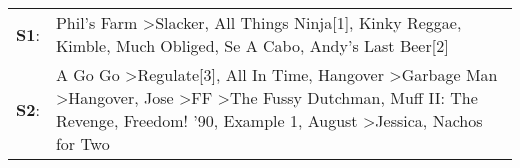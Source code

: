 \begin{supertabular}{p{0.03\textwidth}p{0.92\textwidth}}
 \textbf{S1}:  &                                                                                                                                                                                                                                                                                                                              Phil's Farm\textsuperscript{} \textgreater \enspace Slacker\textsuperscript{}, \enspace All Things Ninja[1]\textsuperscript{}, \enspace Kinky Reggae\textsuperscript{}, \enspace Kimble\textsuperscript{}, \enspace Much Obliged\textsuperscript{}, \enspace Se A Cabo\textsuperscript{}, \enspace Andy's Last Beer[2]\textsuperscript{}  \enspace  \\
 \textbf{S2}:  &  A Go Go\textsuperscript{} \textgreater \enspace Regulate[3]\textsuperscript{}, \enspace All In Time\textsuperscript{}, \enspace Hangover\textsuperscript{} \textgreater \enspace Garbage Man\textsuperscript{} \textgreater \enspace Hangover\textsuperscript{}, \enspace Jose\textsuperscript{} \textgreater \enspace FF\textsuperscript{} \textgreater \enspace The Fussy Dutchman\textsuperscript{}, \enspace Muff II: The Revenge\textsuperscript{}, \enspace Freedom! '90\textsuperscript{}, \enspace Example 1\textsuperscript{}, \enspace August\textsuperscript{} \textgreater \enspace Jessica\textsuperscript{}, \enspace Nachos for Two\textsuperscript{}  \enspace  \\
\end{supertabular}

